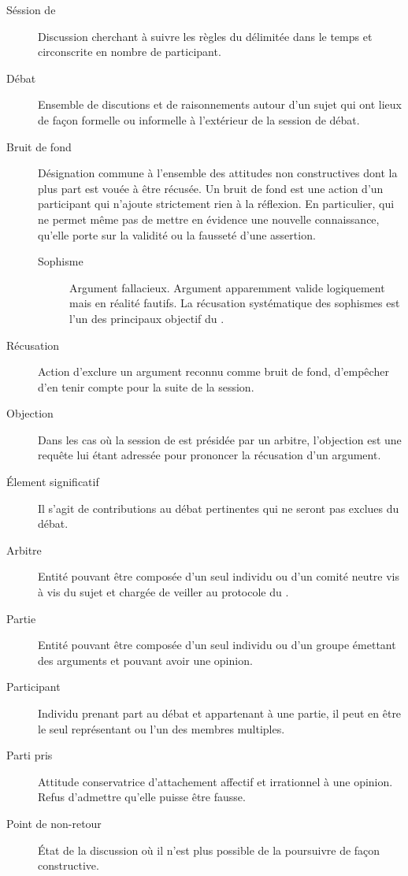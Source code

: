 \begin{description}
  \item[Séssion de \mainabbr{}] Discussion cherchant à suivre les règles du \mainabbr{} délimitée dans le temps et circonscrite en nombre de participant.
  \item[Débat] Ensemble de discutions et de raisonnements autour d’un sujet qui ont lieux de façon formelle ou informelle à l’extérieur de la session de débat.
  \item[Bruit de fond] Désignation commune à l’ensemble des attitudes non constructives dont la plus part est vouée à être récusée. Un bruit de fond est une action d’un participant qui n’ajoute strictement rien à la réflexion. En particulier, qui ne permet même pas de mettre en évidence une nouvelle connaissance, qu’elle porte sur la validité ou la fausseté d’une assertion.

    \begin{description}
      \item[Sophisme] Argument fallacieux. Argument apparemment valide logiquement mais en réalité fautifs. La récusation systématique des sophismes est l’un des principaux objectif du \mainabbr{}.
    \end{description}

  \item[Récusation] Action d’exclure un argument reconnu comme bruit de fond, d’empêcher d’en tenir compte pour la suite de la session.
  \item[Objection] Dans les cas où la session de \mainabbr{} est présidée par un arbitre, l’objection est une requête lui étant adressée pour prononcer la récusation d’un argument.
  \item[Élement significatif] Il s’agit de contributions au débat pertinentes  qui ne seront pas exclues du débat.
  \item[Arbitre] Entité pouvant être composée d’un seul individu ou d’un comité neutre vis à vis du sujet et chargée de veiller au protocole du \mainabbr{}.
  \item[Partie] Entité pouvant être composée d’un seul individu ou d’un groupe émettant des arguments et pouvant avoir une opinion.
  \item[Participant] Individu prenant part au débat et appartenant à une partie, il peut en être le seul représentant ou l’un des membres multiples.
  \item[Parti pris] Attitude conservatrice d’attachement affectif et irrationnel à une opinion. Refus d’admettre qu’elle puisse être fausse.
  \item[Point de non-retour] État de la discussion où il n’est plus possible de la poursuivre de façon constructive.
\end{description}

